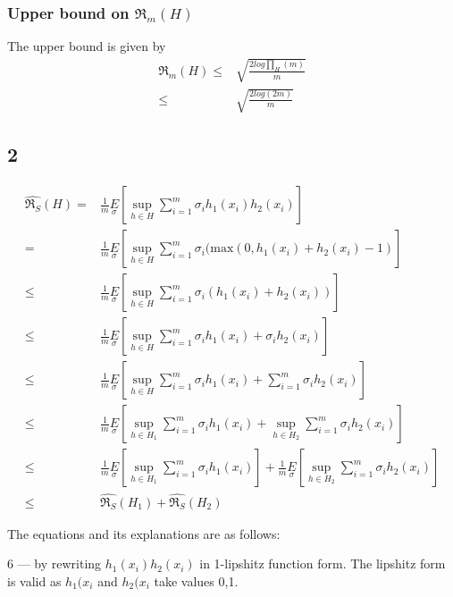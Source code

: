 \documentclass{article}
\begin{document}
\subsubsection*{Upper bound on \( \mathfrak{R}_{m}(H)\)}

The upper bound is given by 
\begin{align*}
  \mathfrak{R}_{m}(H) \le & \sqrt{\frac{2log\prod_{H}(m)}{m}}\\
  \le & \sqrt{\frac{2log(2m)}{m}}
\end{align*}

\newpage
\subsection*{2}

\begin{align}
  \hat{\mathfrak{R}_{S}}(H) = & \frac{1}{m} \underset{\sigma}{E} [\sup_{h \in H} \sum_{i = 1}^{m} \sigma_{i}h_{1}(x_{i})h_{2}(x_{i}) ] \\
  = & \frac{1}{m} \underset{\sigma}{E} [\sup_{h \in H} \sum_{i = 1}^{m} \sigma_{i}( \mathrm{max}(0, h_{1}(x_{i}) + h_{2}(x_{i}) - 1 ) ] \\
  \le &\frac{1}{m} \underset{\sigma}{E} [\sup_{h \in H} \sum_{i = 1}^{m} \sigma_{i}( h_{1}(x_{i}) + h_{2}(x_{i})) ] \\ 
  \le &\frac{1}{m} \underset{\sigma}{E} [\sup_{h \in H} \sum_{i = 1}^{m} \sigma_{i}h_{1}(x_{i}) + \sigma_{i}h_{2}(x_{i}) ] \\ 
  \le &\frac{1}{m} \underset{\sigma}{E} [\sup_{h \in H} \sum_{i = 1}^{m} \sigma_{i}h_{1}(x_{i}) + \sum_{i = 1}^{m} \sigma_{i}h_{2}(x_{i}) ] \\ 
  \le &\frac{1}{m} \underset{\sigma}{E} [\sup_{h \in H_{1}} \sum_{i = 1}^{m} \sigma_{i}h_{1}(x_{i}) + \sup_{h \in H_{2}} \sum_{i = 1}^{m} \sigma_{i}h_{2}(x_{i}) ] \\ 
  \le &\frac{1}{m} \underset{\sigma}{E} [\sup_{h \in H_{1}} \sum_{i = 1}^{m} \sigma_{i}h_{1}(x_{i})] + \frac{1}{m} \underset{\sigma}{E}[ \sup_{h \in H_{2}} \sum_{i = 1}^{m} \sigma_{i}h_{2}(x_{i}) ] \\ 
  \le & \hat{\mathfrak{R}_{S}}(H_{1}) + \hat{\mathfrak{R}_{S}}(H_{2})
\end{align}

The equations and its explanations are as follows:

6 --- by rewriting \( h_{1}(x_{i})h_{2}(x_{i})\) in 1-lipshitz function form.  The lipshitz form is valid as \( h_{1}(x_{i}\) and \( h_{2}(x_{i}\) take values {0,1}.
\end{document}

